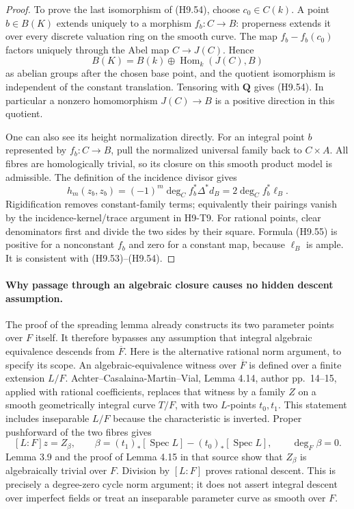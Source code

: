 \begin{proof}
To prove the last isomorphism of (H9.54), choose $c_0\in C(k)$.
A point $b\in B(K)$ extends uniquely to a morphism $f_b:C\to B$:
properness extends it over every discrete valuation ring on the
smooth curve. The map $f_b-f_b(c_0)$ factors uniquely through the
Abel map $C\to J(C)$. Hence
\[
 B(K)=B(k)\oplus\operatorname{Hom}_k(J(C),B)
\]
as abelian groups after the chosen base point, and the quotient
isomorphism is independent of the constant translation. Tensoring
with $\mathbf Q$ gives (H9.54). In particular a nonzero homomorphism
$J(C)\to B$ is a positive direction in this quotient.

One can also see its height normalization directly. For an integral
point $b$ represented by $f_b:C\to B$, pull the normalized universal
family back to $C\times A$. All fibres are homologically trivial,
so its closure on this smooth product model is admissible. The
definition of the incidence divisor gives
\[
 h_m(z_b,z_b)
      =(-1)^m\deg_C f_b^*\Delta^*d_B
      =2\deg_C f_b^*\ell_B.                               \tag{H9.55}
\]
Rigidification removes constant-family terms; equivalently their
pairings vanish by the incidence-kernel/trace argument in H9-T9.
For rational points, clear denominators first and divide the two
sides by their square. Formula (H9.55) is positive for a nonconstant
$f_b$ and zero for a constant map, because $\ell_B$ is ample.
It is consistent with (H9.53)--(H9.54).
\end{proof}

\paragraph{Why passage through an algebraic closure causes no hidden descent assumption.}
The proof of the spreading lemma already constructs its two parameter
points over $F$ itself. It therefore bypasses any assumption that
integral algebraic equivalence descends from $\overline F$.
Here is the alternative rational norm argument, to specify its scope.
An algebraic-equivalence witness over $\overline F$ is defined over
a finite extension $L/F$. Achter--Casalaina-Martin--Vial, Lemma 4.14,
author pp.~14--15, applied with rational coefficients, replaces that
witness by a family $Z$ on a smooth geometrically integral curve
$T/F$, with two $L$-points $t_0,t_1$. This statement includes
inseparable $L/F$ because the characteristic is inverted. Proper
pushforward of the two fibres gives
\[
 [L:F]z
  =Z_{\beta},\qquad
 \beta=(t_1)_*[\operatorname{Spec}L]
            -(t_0)_*[\operatorname{Spec}L],\qquad
 \deg_F\beta=0.
\]
Lemma 3.9 and the proof of Lemma 4.15 in that source show that
$Z_\beta$ is algebraically trivial over $F$. Division by $[L:F]$
proves rational descent. This is precisely a degree-zero cycle
norm argument; it does not assert integral descent over imperfect
fields or treat an inseparable parameter curve as smooth over $F$.

